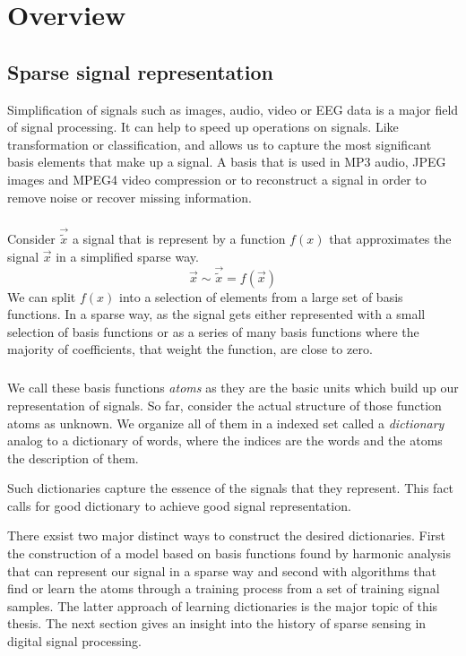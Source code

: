 \chapter{Overview}

\section{Sparse signal representation}
\label{sec:dicts}
Simplification of signals such as images, audio, video or EEG data is a major
field of signal processing. It can help to speed up operations on signals. Like
transformation or classification, and allows us to capture the most
significant basis elements that make up a signal. A basis that is
used in MP3 audio, JPEG images and MPEG4 video compression or to reconstruct
a signal in order to remove noise or recover missing information.

\paragraph{}
Consider $\vec{\tilde{x}}$ a signal that is represent by a function $f(x)$ that
approximates the signal $\vec{x}$ in a simplified sparse way.
\begin{equation*}
\vec{x} \sim \vec{\tilde{x}} = f\left(\vec{x}\right)
\end{equation*}
We can split $f(x)$ into a selection of elements from a large set of
basis functions. In a sparse way, as the signal gets either represented with
a small selection of basis functions or as a series of many basis
functions where the majority of coefficients, that weight the function, are
close to zero. 

\paragraph{}
We call these basis functions \emph{atoms} as they are the basic units
which build up our representation of signals. So far, consider the actual
structure of those function atoms as unknown. We organize all of them in a
indexed set called a \emph{dictionary} analog to a dictionary of words, where
the indices are the words and the atoms the description of them. 

Such dictionaries capture the essence of the signals that they represent.
This fact calls for good dictionary to achieve good signal representation.

There exsist two major distinct ways to construct the desired dictionaries. 
First the construction of a model based on basis functions found by harmonic
analysis that can represent our signal in a sparse way and second with
algorithms that find or learn the atoms through a training process from a set of
training signal samples. The latter approach of learning dictionaries is the
major topic of this thesis. The next section gives an insight into the history
of sparse sensing in digital signal processing. 



